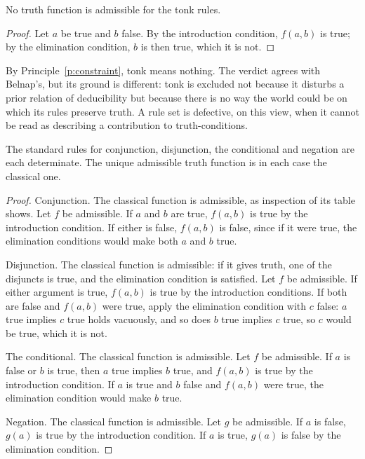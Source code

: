 \documentclass{situationist-preprint}
\begin{document}
\begin{proposition}[Tonk]\label{p:tonk}
No truth function is admissible for the tonk rules.
\end{proposition}

\begin{proof}
Let $a$ be true and $b$ false. By the introduction condition, $f(a,b)$ is true; by the elimination condition, $b$ is then true, which it is not.
\end{proof}

By Principle~\ref{p:constraint}, tonk means nothing. The verdict agrees with Belnap's, but its ground is different: tonk is excluded not because it disturbs a prior relation of deducibility but because there is no way the world could be on which its rules preserve truth. A rule set is defective, on this view, when it cannot be read as describing a contribution to truth-conditions.

\begin{theorem}[Determination]\label{t:det}
The standard rules for conjunction, disjunction, the conditional and negation are each determinate. The unique admissible truth function is in each case the classical one.
\end{theorem}

\begin{proof}
Conjunction. The classical function is admissible, as inspection of its table shows. Let $f$ be admissible. If $a$ and $b$ are true, $f(a,b)$ is true by the introduction condition. If either is false, $f(a,b)$ is false, since if it were true, the elimination conditions would make both $a$ and $b$ true.

Disjunction. The classical function is admissible: if it gives truth, one of the disjuncts is true, and the elimination condition is satisfied. Let $f$ be admissible. If either argument is true, $f(a,b)$ is true by the introduction conditions. If both are false and $f(a,b)$ were true, apply the elimination condition with $c$ false: $a$ true implies $c$ true holds vacuously, and so does $b$ true implies $c$ true, so $c$ would be true, which it is not.

The conditional. The classical function is admissible. Let $f$ be admissible. If $a$ is false or $b$ is true, then $a$ true implies $b$ true, and $f(a,b)$ is true by the introduction condition. If $a$ is true and $b$ false and $f(a,b)$ were true, the elimination condition would make $b$ true.

Negation. The classical function is admissible. Let $g$ be admissible. If $a$ is false, $g(a)$ is true by the introduction condition. If $a$ is true, $g(a)$ is false by the elimination condition.
\end{proof}
\end{document}
